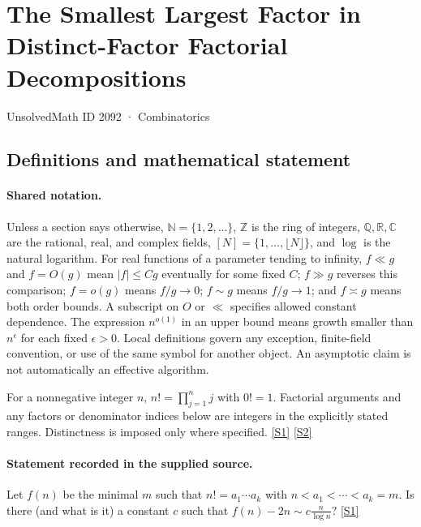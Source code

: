 \documentclass[11pt,a4paper]{article}
\newcommand{\N}{\mathbb{N}}
\newcommand{\Z}{\mathbb{Z}}
\newcommand{\Q}{\mathbb{Q}}
\newcommand{\R}{\mathbb{R}}
\newcommand{\C}{\mathbb{C}}
\newcommand{\sref}[2]{\hyperlink{source:#1:#2}{[S#2]}}
\begin{document}

\setcounter{section}{2091}

\section{The Smallest Largest Factor in Distinct-Factor Factorial Decompositions}\label{2092}

{\small\sffamily UnsolvedMath ID 2092 · Combinatorics}

\subsection{Definitions and mathematical statement}

\paragraph{Shared notation.}Unless a section says otherwise, $\N=\{1,2,\ldots\}$,
$\Z$ is the ring of integers, $\Q,\R,\C$ are the rational, real, and complex
fields, $[N]=\{1,\ldots,\lfloor N\rfloor\}$, and $\log$ is the natural
logarithm. For real functions of a parameter tending to infinity,
$f\ll g$ and $f=O(g)$ mean $|f|\leq Cg$ eventually for some fixed $C$;
$f\gg g$ reverses this comparison; $f=o(g)$ means $f/g\to0$;
$f\sim g$ means $f/g\to1$; and $f\asymp g$ means both order bounds.
A subscript on $O$ or $\ll$ specifies allowed constant dependence.
The expression $n^{o(1)}$ in an upper bound means growth smaller than
$n^\epsilon$ for each fixed $\epsilon>0$. Local definitions govern any
exception, finite-field convention, or use of the same symbol for another
object. An asymptotic claim is not automatically an effective algorithm.



For a nonnegative integer $n$, $n!=\prod_{j=1}^n j$ with $0!=1$. Factorial arguments and any factors or denominator indices below are integers in the explicitly stated ranges. Distinctness is imposed only where specified. \sref{2092}{1} \sref{2092}{2}

\paragraph{Statement recorded in the supplied source.}
Let $f(n)$ be the minimal $m$ such that $ n! = a_1\cdots a_k $ with $n< a_1<\cdots <a_k=m$. Is there (and what is it) a constant $c$ such that $ f(n)-2n \sim c\frac{n}{\log n}? $ \sref{2092}{1}
\end{document}

